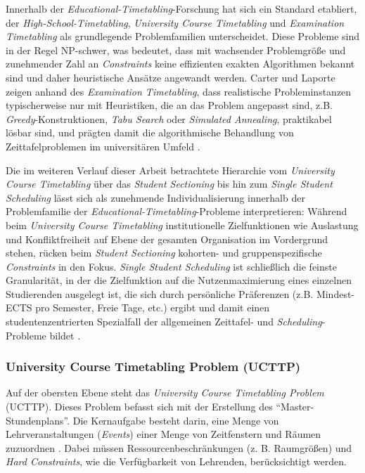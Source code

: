 Innerhalb der \textit{Educational-Timetabling}-Forschung hat sich ein Standard etabliert, der \textit{High-School-Timetabling}, \textit{University Course Timetabling} und \textit{Examination Timetabling} als grundlegende Problemfamilien unterscheidet. Diese Probleme sind in der Regel NP-schwer, was bedeutet, dass mit wachsender Problemgröße und zunehmender Zahl an \textit{Constraints} keine effizienten exakten Algorithmen bekannt sind und daher heuristische Ansätze angewandt werden. Carter und Laporte \cite{carter-1996} zeigen anhand des \textit{Examination Timetabling}, dass realistische Probleminstanzen typischerweise nur mit Heuristiken, die an das Problem angepasst sind, z.B. \textit{Greedy}-Konstruktionen, \textit{Tabu Search} oder \textit{Simulated Annealing}, praktikabel lösbar sind, und prägten damit die algorithmische Behandlung von Zeittafelproblemen im universitären Umfeld \cite{carter-1996}.

Die im weiteren Verlauf dieser Arbeit betrachtete Hierarchie vom \textit{University Course Timetabling} über das \textit{Student Sectioning} bis hin zum \textit{Single Student Scheduling} lässt sich als zunehmende Individualisierung innerhalb der Problemfamilie der \textit{Educational-Timetabling}-Probleme interpretieren: Während beim \textit{University Course Timetabling} institutionelle Zielfunktionen wie Auslastung und Konfliktfreiheit auf Ebene der gesamten Organisation im Vordergrund stehen, rücken beim \textit{Student Sectioning} kohorten- und gruppenspezifische \textit{Constraints} in den Fokus. \textit{Single Student Scheduling} ist schließlich die feinste Granularität, in der die Zielfunktion auf die Nutzenmaximierung eines einzelnen Studierenden ausgelegt ist, die sich durch persönliche Präferenzen (z.B. Mindest-ECTS pro Semester, Freie Tage, etc.) ergibt und damit einen studentenzentrierten Spezialfall der allgemeinen Zeittafel- und \textit{Scheduling}-Probleme bildet \cite{rudova-2003,muller-2010}.




\subsubsection{University Course Timetabling Problem (UCTTP)}\label{chap:ucttp}

Auf der obersten Ebene steht das \textit{University Course Timetabling Problem} (UCTTP). Dieses Problem befasst sich mit der Erstellung des \enquote{Master-Stundenplans}. Die Kernaufgabe besteht darin, eine Menge von Lehrveranstaltungen (\textit{Events}) einer Menge von Zeitfenstern und Räumen zuzuordnen \cite{schaerf-1999}. Dabei müssen Ressourcenbeschränkungen (z. B. Raumgrößen) und \textit{Hard Constraints}, wie die Verfügbarkeit von Lehrenden, berücksichtigt werden.

